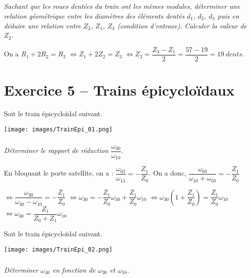 \documentclass[10pt,fleqn]{article} %
\begin{document}
\begin{multicols}{2}
\begin{multicols}{2}
\subparagraph{}
\textit{Sachant que les roues dentées du train ont les mêmes modules, déterminer une relation géométrique entre les diamètres des éléments dentés $d_1$, $d_2$, $d_3$ puis en déduire une relation entre $Z_2$, $Z_1$, $Z_3$ (condition d’entraxe). Calculer la valeur de $Z_2$.}

 \ifprof
 \begin{corrige}
 On a $R_1+2R_2 = R_3$ $\Leftrightarrow Z_1+2Z_2 = Z_3$ $\Leftrightarrow Z_2 = \dfrac{Z_3- Z_1}{2}=\dfrac{57-19}{2}=\SI{19}{dents}$.
 \end{corrige}
 \else
 \fi



\section*{Exercice 5 -- Trains épicycloïdaux}
\setcounter{exo}{0}

\ifprof
\else
Soit le train épicycloïdal suivant. 

\begin{center}
 \texttt{[image: images/TrainEpi\_01.png]}
\end{center}
\fi


\subparagraph{}
\textit{Déterminer le rapport de réduction $\dfrac{\omega_{30}}{\omega_{10}}$.}
 \ifprof
 \begin{corrige}
 
 En bloquant le porte satellite, on a : $\dfrac{\omega_{03}}{\omega_{13}}=-\dfrac{Z_1}{Z_0}$. On a donc, 
$\dfrac{\omega_{03}}{\omega_{10}+\omega_{03}}=-\dfrac{Z_1}{Z_0}$

$\Leftrightarrow \dfrac{\omega_{30}}{\omega_{30}-\omega_{10}}=-\dfrac{Z_1}{Z_0}$
$\Leftrightarrow \omega_{30}=-\dfrac{Z_1}{Z_0} \omega_{30}+\dfrac{Z_1}{Z_0}\omega_{10} $
$\Leftrightarrow \omega_{30}\left( 1+\dfrac{Z_1}{Z_0} \right)=\dfrac{Z_1}{Z_0}\omega_{10} $
$\Leftrightarrow \omega_{30}=\dfrac{Z_1}{Z_0+Z_1}\omega_{10} $
 \end{corrige}
 \else
 \fi


\ifprof
\else

Soit le train épicycloïdal suivant. 

\begin{center}
 \texttt{[image: images/TrainEpi\_02.png]}
\end{center}
\fi



\subparagraph{}
\textit{Déterminer $\omega_{40}$ en fonction de  $\omega_{30}$ et $\omega_{10}$.}
 \ifprof
 \begin{corrige}
 

\end{corrige}
\end{multicols}
\end{multicols}
\end{document}
